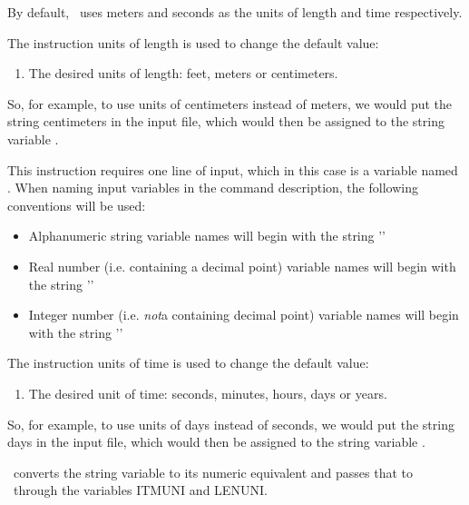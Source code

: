 \label{section:Units}
By default, \mut\ uses meters and seconds as the units of length and time respectively.

The instruction \textsf{units of length} is used to change the default value:

    {
        \squish
        \begin{enumerate}
        \item {}  The desired units of length: feet, meters or centimeters.
        \end{enumerate}

        So, for example, to use units of centimeters instead of meters, we would put the string \textsf{centimeters} in the input file, which would then be assigned to the string variable . }

This instruction requires one line of input, which in this case is a variable named .  When naming input variables in the command description, the following conventions will be used:
\begin{itemize}
    \item Alphanumeric string variable names will begin with
    the string '\str{}'
    \item Real number (i.e. containing a decimal point) variable names will begin with
    the string '\rnum{}'
    \item Integer number (i.e. {\em not}a  containing decimal point) variable names will begin with
    the string '\inum{}'
\end{itemize}

The instruction \textsf{units of time} is used to change the default value:

    {
        \squish
        \begin{enumerate}
        \item {}  The desired unit of time: seconds, minutes, hours, days or years.
        \end{enumerate}

        So, for example, to use units of days instead of seconds, we would put the string \textsf{days} in the input file, which would then be assigned to the string variable .
    }

\mut\ converts the string variable  to its numeric equivalent and passes that to \mfus\ through the variables \textsf{ITMUNI} and \textsf{LENUNI}.
